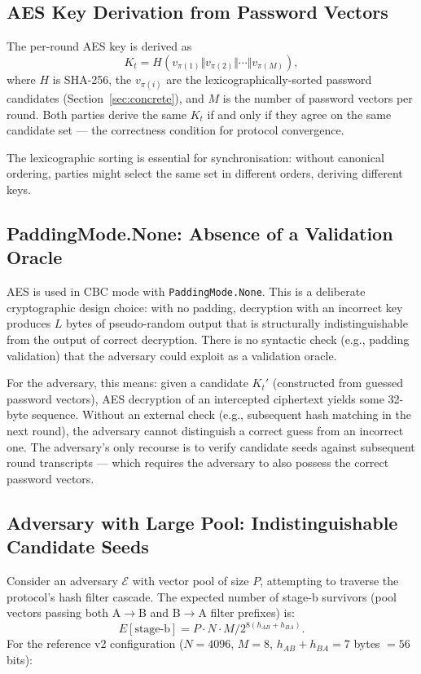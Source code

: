 \documentclass[11pt,a4paper]{article}
\begin{document}
\subsection{AES Key Derivation from Password Vectors}

The per-round AES key is derived as
\[
K_t = H(v_{\pi(1)} \Vert v_{\pi(2)} \Vert \cdots \Vert v_{\pi(M)}),
\]
where $H$ is SHA-256, the $v_{\pi(i)}$ are the lexicographically-sorted password candidates (Section~\ref{sec:concrete}), and $M$ is the number of password vectors per round. Both parties derive the same $K_t$ if and only if they agree on the same candidate set --- the correctness condition for protocol convergence.

The lexicographic sorting is essential for synchronisation: without canonical ordering, parties might select the same set in different orders, deriving different keys.

\subsection{PaddingMode.None: Absence of a Validation Oracle}

AES is used in CBC mode with \texttt{PaddingMode.None}. This is a deliberate cryptographic design choice: with no padding, decryption with an incorrect key produces $L$ bytes of pseudo-random output that is structurally indistinguishable from the output of correct decryption. There is no syntactic check (e.g., padding validation) that the adversary could exploit as a validation oracle.

For the adversary, this means: given a candidate $K_t'$ (constructed from guessed password vectors), AES decryption of an intercepted ciphertext yields some 32-byte sequence. Without an external check (e.g., subsequent hash matching in the next round), the adversary cannot distinguish a correct guess from an incorrect one. The adversary's only recourse is to verify candidate seeds against subsequent round transcripts --- which requires the adversary to also possess the correct password vectors.

\subsection{Adversary with Large Pool: Indistinguishable Candidate Seeds}\label{sec:flooding}

Consider an adversary $\mathcal{E}$ with vector pool of size $P$, attempting to traverse the protocol's hash filter cascade. The expected number of stage-b survivors (pool vectors passing both A$\to$B and B$\to$A filter prefixes) is:
\[
E[\text{stage-b}] = P \cdot N \cdot M / 2^{8(h_{AB} + h_{BA})}.
\]
For the reference v2 configuration ($N = 4096$, $M = 8$, $h_{AB} + h_{BA} = 7$ bytes $= 56$ bits):
\end{document}
